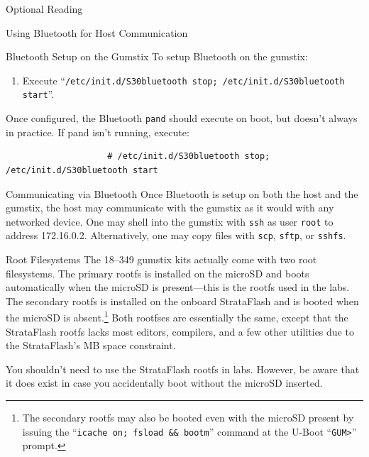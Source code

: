 \documentclass{article}
\begin{document}
\begin{section}{Optional Reading}
\begin{subsection}{Using Bluetooth for Host Communication}
			\begin{subsubsection}{Bluetooth Setup on the Gumstix}
				To setup Bluetooth on the gumstix:
				\begin{enumerate}
					\begin{item}
						Edit \texttt{/etc/default/bluetooth}:
						\begin{itemize}
							\item Change ``\verb|PAND_ENABLE=false|'' to ``\verb|PAND_ENABLE=true|''.
							\item Replace the \texttt{XX}s in ``\texttt{PAND\_OPTIONS}'' with the
							      host's Bluetooth device address.
						\end{itemize}
					\end{item}
					\item Execute ``\verb|/etc/init.d/S30bluetooth stop; /etc/init.d/S30bluetooth start|''.
				\end{enumerate}
				Once configured, the Bluetooth \texttt{pand} should execute on boot, but
				doesn't always in practice.  If pand isn't running, execute:
				\begin{verbatim}
					# /etc/init.d/S30bluetooth stop; /etc/init.d/S30bluetooth start
				\end{verbatim}
			\end{subsubsection}

			\begin{subsubsection}{Communicating via Bluetooth}
				Once Bluetooth is setup on both the host and the gumstix, the host may
				communicate with the gumstix as it would with any networked device.  One
				may shell into the gumstix with \texttt{ssh} as user \texttt{root} to
				address 172.16.0.2.  Alternatively, one may copy files with \texttt{scp},
				\texttt{sftp}, or \texttt{sshfs}.
			\end{subsubsection}
		\end{subsection}

		\begin{subsection}{Root Filesystems}
			The 18--349 gumstix kits actually come with two root filesystems.  The
			primary rootfs is installed on the microSD and boots automatically when the microSD
			is present---this is the rootfs used in the labs.  The secondary rootfs is
			installed on the onboard StrataFlash and is booted when the microSD is
			absent.\footnote{The secondary rootfs may also be booted even with the microSD			present by issuing the \mbox{``\texttt{icache on; fsload \&\& bootm}''}
			command at the U-Boot ``\texttt{GUM>}'' prompt.}  Both rootfses are
			essentially the same, except that the StrataFlash rootfs lacks most
			editors, compilers, and a few other utilities due to the StrataFlash's
			\unit[16]{MB} space constraint.

			You shouldn't need to use the StrataFlash rootfs in labs.  However, be
			aware that it does exist in case you accidentally boot without the microSD
			inserted.
		\end{subsection}
        
	\end{section}
\end{document}
